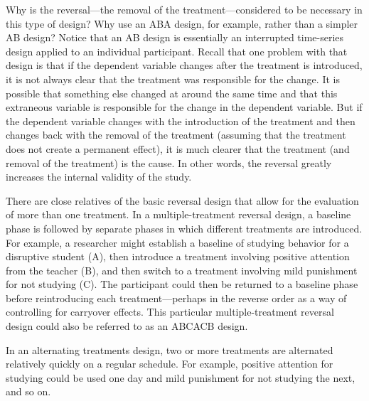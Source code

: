 Why is the reversal---the removal of the treatment---considered to be necessary in this type of design? Why use an ABA design, for example, rather than a simpler AB design? Notice that an AB design is essentially an interrupted time-series design applied to an individual participant. Recall that one problem with that design is that if the dependent variable changes after the treatment is introduced, it is not always clear that the treatment was responsible for the change. It is possible that something else changed at around the same time and that this extraneous variable is responsible for the change in the dependent variable. But if the dependent variable changes with the introduction of the treatment and then changes back with the removal of the treatment (assuming that the treatment does not create a permanent effect), it is much clearer that the treatment (and removal of the treatment) is the cause. In other words, the reversal greatly increases the internal validity of the study.

There are close relatives of the basic reversal design that allow for the evaluation of more than one treatment. In a multiple-treatment reversal design, a baseline phase is followed by separate phases in which different treatments are introduced. For example, a researcher might establish a baseline of studying behavior for a disruptive student (A), then introduce a treatment involving positive attention from the teacher (B), and then switch to a treatment involving mild punishment for not studying (C). The participant could then be returned to a baseline phase before reintroducing each treatment---perhaps in the reverse order as a way of controlling for carryover effects. This particular multiple-treatment reversal design could also be referred to as an ABCACB design.

In an alternating treatments design, two or more treatments are alternated relatively quickly on a regular schedule. For example, positive attention for studying could be used one day and mild punishment for not studying the next, and so on.


